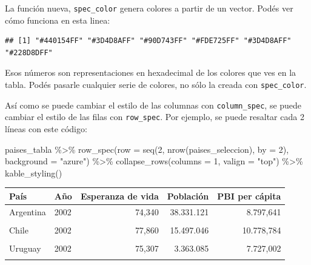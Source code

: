 \documentclass[
  openany]{book}
\newenvironment{Shaded}{\begin{snugshade}}{\end{snugshade}}
\newcommand{\AttributeTok}[1]{\textcolor[rgb]{0.77,0.63,0.00}{#1}}
\newcommand{\DecValTok}[1]{\textcolor[rgb]{0.00,0.00,0.81}{#1}}
\newcommand{\FunctionTok}[1]{\textcolor[rgb]{0.00,0.00,0.00}{#1}}
\newcommand{\NormalTok}[1]{#1}
\newcommand{\SpecialCharTok}[1]{\textcolor[rgb]{0.00,0.00,0.00}{#1}}
\newcommand{\StringTok}[1]{\textcolor[rgb]{0.31,0.60,0.02}{#1}}
\begin{document}
La función nueva, \texttt{spec\_color} genera colores a partir de un vector.
Podés ver cómo funciona en esta linea:

\begin{Shaded}
\end{Shaded}

\begin{verbatim}
## [1] "#440154FF" "#3D4D8AFF" "#90D743FF" "#FDE725FF" "#3D4D8AFF" "#228D8DFF"
\end{verbatim}

Esos números son representaciones en hexadecimal de los colores que ves en la tabla.
Podés pasarle cualquier serie de colores, no sólo la creada con \texttt{spec\_color}.

Así como se puede cambiar el estilo de las columnas con \texttt{column\_spec}, se puede cambiar el estilo de las filas con \texttt{row\_spec}.
Por ejemplo, se puede resaltar cada 2 líneas con este código:

\begin{Shaded}
\begin{Highlighting}[]
\NormalTok{paises\_tabla }\SpecialCharTok{\%\textgreater{}\%} 
  \FunctionTok{row\_spec}\NormalTok{(}\AttributeTok{row =} \FunctionTok{seq}\NormalTok{(}\DecValTok{2}\NormalTok{, }\FunctionTok{nrow}\NormalTok{(paises\_seleccion), }\AttributeTok{by =} \DecValTok{2}\NormalTok{), }\AttributeTok{background =} \StringTok{"azure"}\NormalTok{) }\SpecialCharTok{\%\textgreater{}\%} 
  \FunctionTok{collapse\_rows}\NormalTok{(}\AttributeTok{columns =} \DecValTok{1}\NormalTok{, }\AttributeTok{valign =} \StringTok{"top"}\NormalTok{)  }\SpecialCharTok{\%\textgreater{}\%}
  \FunctionTok{kable\_styling}\NormalTok{() }
\end{Highlighting}
\end{Shaded}

\begin{table}
\centering
\begin{tabular}{l|l|r|r|r}
\hline
País & Año & Esperanza de vida & Población & PBI per cápita\\
\hline
Argentina & 2002 & 74,340 & 38.331.121 & 8.797,641\\
\cline{1-5}
\cellcolor{azure}{Argentina} & \cellcolor{azure}{2007} & \cellcolor{azure}{75,320} & \cellcolor{azure}{40.301.927} & \cellcolor{azure}{12.779,380}\\
\cline{1-5}
Chile & 2002 & 77,860 & 15.497.046 & 10.778,784\\
\cline{1-5}
\cellcolor{azure}{Chile} & \cellcolor{azure}{2007} & \cellcolor{azure}{78,553} & \cellcolor{azure}{16.284.741} & \cellcolor{azure}{13.171,639}\\
\cline{1-5}
Uruguay & 2002 & 75,307 & 3.363.085 & 7.727,002\\
\cline{1-5}
\cellcolor{azure}{Uruguay} & \cellcolor{azure}{2007} & \cellcolor{azure}{76,384} & \cellcolor{azure}{3.447.496} & \cellcolor{azure}{10.611,463}\\
\hline
\end{tabular}
\end{table}
\end{document}
